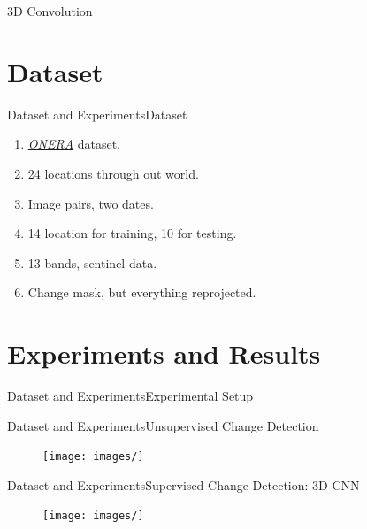 \documentclass[handout]{beamer}
\begin{document}
\begin{frame}{3D Convolution}
  \begin{enumerate}

  \end{enumerate}
\end{frame}

\section{Dataset}
\begin{frame}{Dataset and Experiments}{Dataset}
  \begin{enumerate}
    \item \href{https://rcdaudt.github.io/oscd/}{\color{blue}\textit{ONERA}} dataset.
    \item 24 locations through out world.
    \item Image pairs, two dates.
    \item 14 location for training, 10 for testing.
    \item 13 bands, sentinel data.
    \item Change mask, but everything reprojected.
  \end{enumerate}
\end{frame}

\section{Experiments and Results}
\begin{frame}{Dataset and Experiments}{Experimental Setup}
  \begin{enumerate}

  \end{enumerate}
\end{frame}

\begin{frame}{Dataset and Experiments}{Unsupervised Change Detection}
  \begin{enumerate}

  \end{enumerate}
  \begin{center}
    \begin{figure}
    \texttt{[image: images/]}
    \end{figure}
  \end{center}
\end{frame}

\begin{frame}{Dataset and Experiments}{Supervised Change Detection: 3D CNN}
  \begin{enumerate}

  \end{enumerate}
  \begin{center}
    \begin{figure}
    \texttt{[image: images/]}
    \end{figure}
  \end{center}
\end{frame}
\end{document}
